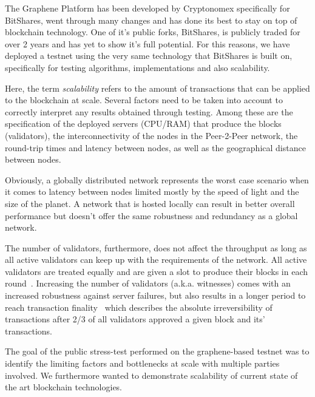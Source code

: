 The Graphene Platform has been developed by Cryptonomex specifically for
BitShares, went through many changes and has done its best to stay on top of
blockchain technology. One of it's public forks, BitShares, is publicly traded
for over 2 years and has yet to show it's full potential. For this reasons, we
have deployed a testnet using the very same technology that BitShares is built
on, specifically for testing algorithms, implementations and also scalability.

Here, the term \emph{scalability} refers to the amount of transactions that can
be applied to the blockchain at scale. Several factors need to be taken into
account to correctly interpret any results obtained through testing. Among
these are the specification of the deployed servers (CPU/RAM) that produce the
blocks (validators), the interconnectivity of the nodes in the Peer-2-Peer
network, the round-trip times and latency between nodes, as well as the
geographical distance between nodes.

Obviously, a globally distributed network represents the worst case scenario
when it comes to latency between nodes limited mostly by the speed of light and
the size of the planet. A network that is hosted locally can result in better
overall performance but doesn't offer the same robustness and redundancy as a
global network.

The number of validators, furthermore, does not affect the throughput as long
as all active validators can keep up with the requirements of the network. All
active validators are treated equally and are given a slot to produce their
blocks in each round~\cite{bts:general}. Increasing the number of validators
(a.k.a. witnesses) comes with an increased robustness against server failures,
but also results in a longer period to reach transaction
finality~\cite{bts:general} which describes the absolute irreversibility of
transactions after 2/3 of all validators approved a given block and its'
transactions.

The goal of the public stress-test performed on the graphene-based testnet was
to identify the limiting factors and bottlenecks at scale with multiple parties
involved. We furthermore wanted to demonstrate scalability of current state of
the art blockchain technologies.
